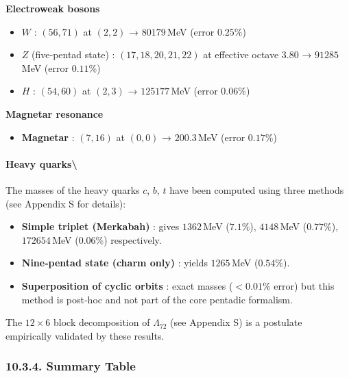 \documentclass[11pt]{article}
\providecommand{\tightlist}{\setlength{\itemsep}{2pt}\setlength{\parskip}{6pt}}
\providecommand{\tightlist}{%
  \setlength{\itemsep}{2pt}\setlength{\parskip}{6pt}
}
\begin{document}
\textbf{Electroweak bosons}

\begin{itemize}
\tightlist
\item
  \textbf{\(W\)} : \((56,71)\) at \((2,2)\) → \(80179\)\,MeV (error
  \(0.25\%\))
\item
  \textbf{\(Z\)} (five‑pentad state) : \((17,18,20,21,22)\) at effective
  octave \(3.80\) → \(91285\)\,MeV (error \(0.11\%\))
\item
  \textbf{\(H\)} : \((54,60)\) at \((2,3)\) → \(125177\)\,MeV (error
  \(0.06\%\))
\end{itemize}

\textbf{Magnetar resonance}

\begin{itemize}
\tightlist
\item
  \textbf{Magnetar} : \((7,16)\) at \((0,0)\) → \(200.3\)\,MeV (error
  \(0.17\%\))
\end{itemize}

\hypertarget{heavy-quarks}{%
\paragraph{Heavy quarks\textbackslash{}}\label{heavy-quarks}}

The masses of the heavy quarks \(c\), \(b\), \(t\) have been computed
using three methods (see Appendix S for details):

\begin{itemize}
\tightlist
\item
  \textbf{Simple triplet (Merkabah)} : gives \(1362\)\,MeV (\(7.1\%\)),
  \(4148\)\,MeV (\(0.77\%\)), \(172654\)\,MeV (\(0.06\%\)) respectively.
\item
  \textbf{Nine‑pentad state (charm only)} : yields \(1265\)\,MeV
  (\(0.54\%\)).
\item
  \textbf{Superposition of cyclic orbits} : exact masses (\(<0.01\%\)
  error) but this method is post‑hoc and not part of the core pentadic
  formalism.
\end{itemize}

The \(12 \times 6\) block decomposition of \(\Lambda_{72}\) (see
Appendix S) is a postulate empirically validated by these results.

\hypertarget{summary-table}{%
\subsubsection{10.3.4. Summary Table}\label{summary-table}}
\end{document}
